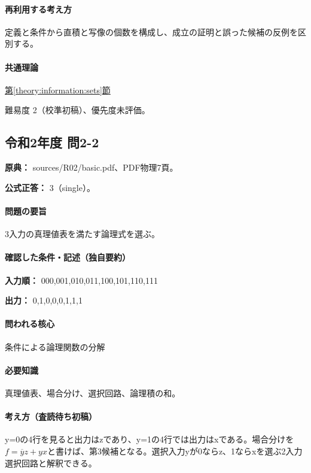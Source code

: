 \paragraph{再利用する考え方} 定義と条件から直積と写像の個数を構成し、成立の証明と誤った候補の反例を区別する。

\paragraph{共通理論} \hyperref[theory:information:sets]{第\ref*{theory:information:sets}節}

\par 難易度 2（校準初稿）、優先度未評価。

\subsection{令和2年度 問2-2}
\label{q:r02-reg-basic-2-2}

\noindent\textbf{原典：} sources/R02/basic.pdf、PDF物理7頁。

\textbf{公式正答：} 3（single）。

\paragraph{問題の要旨} 3入力の真理値表を満たす論理式を選ぶ。

\paragraph{確認した条件・記述（独自要約）}\mbox{}\par

\noindent\textbf{入力順：} 000,001,010,011,100,101,110,111\par

\noindent\textbf{出力：} 0,1,0,0,0,1,1,1\par

\paragraph{問われる核心} 条件による論理関数の分解

\paragraph{必要知識} 真理値表、場合分け、選択回路、論理積の和。

\paragraph{考え方（査読待ち初稿）} y=\allowbreak{}0の4行を見ると出力はzであり、y=\allowbreak{}1の4行では出力はxである。場合分けを\(f=\overline y z+yx\)と書けば、第3候補となる。選択入力yが0ならz、1ならxを選ぶ2入力選択回路と解釈できる。

